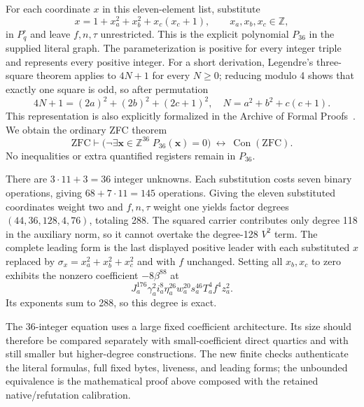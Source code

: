 For each coordinate $x$ in this eleven-element list, substitute
\begin{equation}\label{eq:ordinatepositiveparameter}
 x=1+x_a^2+x_b^2+x_c(x_c+1),\qquad x_a,x_b,x_c\in\mathbb Z,
\end{equation}
in $P_q^{\circ}$ and leave $f,n,\tau$ unrestricted. This is the explicit
polynomial $P_{36}$ in the supplied literal graph. The parameterization is
positive for every integer triple and represents every positive integer.
For a short derivation, Legendre's three-square theorem applies to $4N+1$
for every $N\ge0$; reducing modulo 4 shows that exactly one square
is odd, so after permutation
\[
 4N+1=(2a)^2+(2b)^2+(2c+1)^2,
 \quad N=a^2+b^2+c(c+1).
\]
This representation is also explicitly formalized in the Archive of Formal
Proofs~\cite{danilkin2023}. We obtain the ordinary ZFC theorem
\begin{equation}\label{eq:ordinateintegercon}
 \boxed{\mathrm{ZFC}\vdash
  \bigl(\neg\exists\mathbf x\in\mathbb Z^{36}\;P_{36}(\mathbf x)=0\bigr)
  \ \longleftrightarrow\ \operatorname{Con}(\mathrm{ZFC}).}
\end{equation}
No inequalities or extra quantified registers remain in $P_{36}$.

There are $3\cdot11+3=36$ integer unknowns. Each substitution costs seven
binary operations, giving $68+7\cdot11=145$ operations. Giving the eleven
substituted coordinates weight two and $f,n,\tau$ weight one yields factor
degrees $(44,36,128,4,76)$, totaling 288. The squared carrier contributes
only degree 118 in the auxiliary norm, so it cannot overtake the degree-128
$V^2$ term. The complete leading form is the last displayed positive
leader with each substituted $x$ replaced by
$\sigma_x=x_a^2+x_b^2+x_c^2$ and with $f$ unchanged. Setting all $x_b,x_c$
to zero exhibits the nonzero coefficient $-8\beta^{88}$ at
\[
 J_a^{176}\gamma_a^2 i_a^8\eta_a^{26}w_a^{20}s_a^{46}T_a^4f^4z_a^2.
\]
Its exponents sum to 288, so this degree is exact.

The 36-integer equation uses a large fixed coefficient architecture. Its
size should therefore be compared separately with small-coefficient direct
quartics and with still smaller but higher-degree constructions. The new
finite checks authenticate the literal formulas, full fixed bytes, liveness,
and leading forms; the unbounded equivalence is the mathematical proof above
composed with the retained native/refutation calibration.
